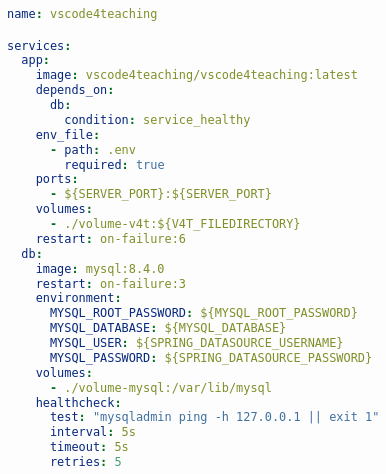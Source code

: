 \begin{lstlisting}[language=YAML,caption={Fichero \textit{docker-compose.yml} empleado para la orquestación de la imagen Docker del servidor con un contenedor para la base de datos.},label=cod:dockerCompose]
name: vscode4teaching

services:
  app:
    image: vscode4teaching/vscode4teaching:latest
    depends_on:
      db:
        condition: service_healthy
    env_file:
      - path: .env
        required: true
    ports:
      - ${SERVER_PORT}:${SERVER_PORT}
    volumes:
      - ./volume-v4t:${V4T_FILEDIRECTORY}
    restart: on-failure:6
  db:
    image: mysql:8.4.0
    restart: on-failure:3
    environment:
      MYSQL_ROOT_PASSWORD: ${MYSQL_ROOT_PASSWORD}
      MYSQL_DATABASE: ${MYSQL_DATABASE}
      MYSQL_USER: ${SPRING_DATASOURCE_USERNAME}
      MYSQL_PASSWORD: ${SPRING_DATASOURCE_PASSWORD}
    volumes:
      - ./volume-mysql:/var/lib/mysql
    healthcheck:
      test: "mysqladmin ping -h 127.0.0.1 || exit 1"
      interval: 5s
      timeout: 5s
      retries: 5
\end{lstlisting}
